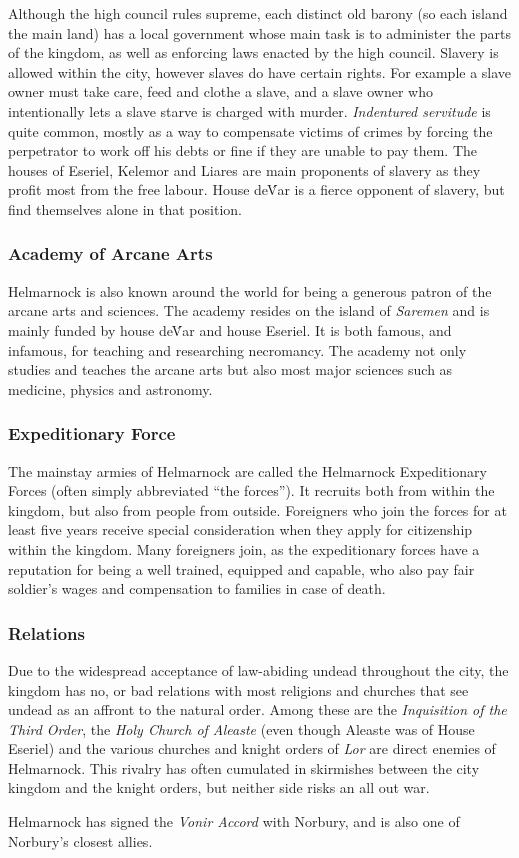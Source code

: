 Although the high council rules supreme, each distinct old barony (so each
island the main land) has a local government whose main task is to administer
the parts of the kingdom, as well as enforcing laws enacted by the high council.
Slavery is allowed within the city, however slaves do have certain rights. For
example a slave owner must take care, feed and clothe a slave, and a slave
owner who intentionally lets a slave starve is charged with murder.
\emph{Indentured servitude} is quite common, mostly as a way to compensate
victims of crimes by forcing the perpetrator to work off his debts or fine if
they are unable to pay them. The houses of Eseriel, Kelemor and Liares are main
proponents of slavery as they profit most from the free labour. House de\'Var
is a fierce opponent of slavery, but find themselves alone in that position.

\subsubsection*{Academy of Arcane Arts}

Helmarnock is also known around the world for being a generous patron of the
arcane arts and sciences. The academy resides on the island of \emph{Saremen}
and is mainly funded by house de\'Var and house Eseriel. It is both famous,
and infamous, for teaching and researching necromancy. The academy not only
studies and teaches the arcane arts but also most major sciences such as
medicine, physics and astronomy.

\subsubsection*{Expeditionary Force}

The mainstay armies of Helmarnock are called the Helmarnock Expeditionary
Forces (often simply abbreviated ``the forces''). It recruits both from
within the kingdom, but also from people from outside. Foreigners who join the
forces for at least five years receive special consideration when they apply for
citizenship within the kingdom. Many foreigners join, as the expeditionary
forces have a reputation for being a well trained, equipped and capable, who
also pay fair soldier's wages and compensation to families in case of death.

\subsubsection*{Relations}

Due to the widespread acceptance of law-abiding undead throughout the city, the
kingdom has no, or bad relations with most religions and churches that see
undead as an affront to the natural order. Among these are the
\emph{Inquisition of the Third Order}, the \emph{Holy Church of Aleaste} (even
though Aleaste was of House Eseriel) and the various churches and knight
orders of \emph{Lor} are direct enemies of Helmarnock. This rivalry has often
cumulated in skirmishes between the city kingdom and the knight orders, but
neither side risks an all out war.

Helmarnock has signed the \emph{Vonir Accord} with Norbury, and is also one
of Norbury's closest allies.
